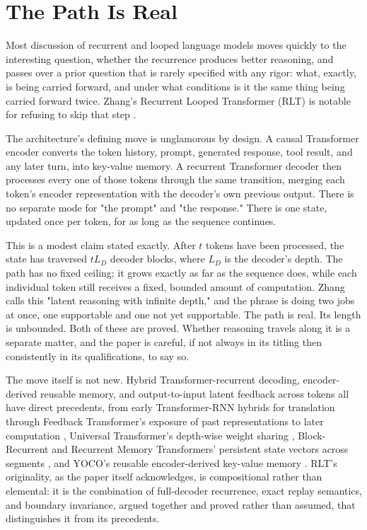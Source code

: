 \documentclass[11pt]{article}
\begin{document}
\section{The Path Is Real}

Most discussion of recurrent and looped language models moves quickly to the interesting question, whether the recurrence produces better reasoning, and passes over a prior question that is rarely specified with any rigor: what, exactly, is being carried forward, and under what conditions is it the same thing being carried forward twice. Zhang's Recurrent Looped Transformer (RLT) is notable for refusing to skip that step \cite{zhang2026rlt}.

The architecture's defining move is unglamorous by design. A causal Transformer encoder converts the token history, prompt, generated response, tool result, and any later turn, into key-value memory. A recurrent Transformer decoder then processes every one of those tokens through the same transition, merging each token's encoder representation with the decoder's own previous output. There is no separate mode for "the prompt" and "the response." There is one state, updated once per token, for as long as the sequence continues.

This is a modest claim stated exactly. After $t$ tokens have been processed, the state has traversed $tL_D$ decoder blocks, where $L_D$ is the decoder's depth. The path has no fixed ceiling; it grows exactly as far as the sequence does, while each individual token still receives a fixed, bounded amount of computation. Zhang calls this "latent reasoning with infinite depth," and the phrase is doing two jobs at once, one supportable and one not yet supportable. The path is real. Its length is unbounded. Both of these are proved. Whether reasoning travels along it is a separate matter, and the paper is careful, if not always in its titling then consistently in its qualifications, to say so.

The move itself is not new. Hybrid Transformer-recurrent decoding, encoder-derived reusable memory, and output-to-input latent feedback across tokens all have direct precedents, from early Transformer-RNN hybrids for translation through Feedback Transformer's exposure of past representations to later computation \cite{fan2020feedback}, Universal Transformer's depth-wise weight sharing \cite{dehghani2019universal}, Block-Recurrent and Recurrent Memory Transformers' persistent state vectors across segments \cite{hutchins2022block,bulatov2022recurrent}, and YOCO's reusable encoder-derived key-value memory \cite{sun2024yoco}. RLT's originality, as the paper itself acknowledges, is compositional rather than elemental: it is the combination of full-decoder recurrence, exact replay semantics, and boundary invariance, argued together and proved rather than assumed, that distinguishes it from its precedents.
\end{document}
